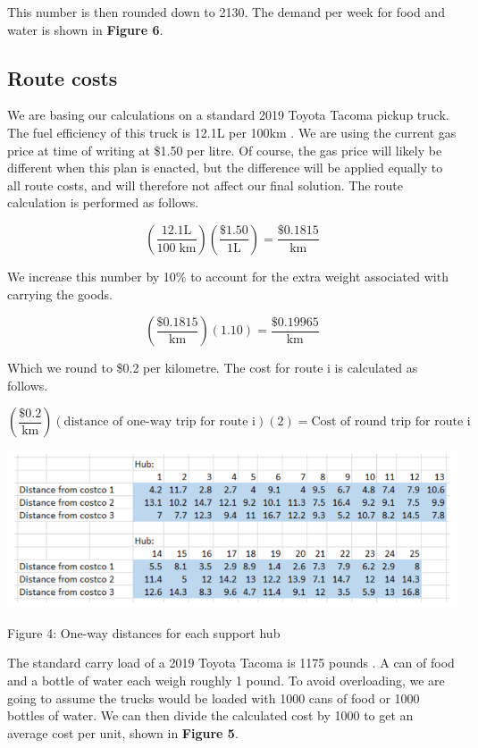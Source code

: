 \documentclass{article}
\begin{document}
This number is then rounded down to 2130. The demand per week for food and water is shown in \textbf{Figure 6}.

\subsection{Route costs}

We are basing our calculations on a standard 2019 Toyota Tacoma pickup truck. The fuel efficiency of this truck is 12.1L per 100km \cite{fuelconsumptionguide}. We are using the current gas price at time of writing at \$1.50 per litre. Of course, the gas price will likely be different when this plan is enacted, but the difference will be applied equally to all route costs, and will therefore not affect our final solution. The route calculation is performed as follows.

\[(\frac{12.1\text{L}}{100\;\text{km}})(\frac{\$1.50}{1\text{L}}) = \frac{\$0.1815}{\text{km}}\]

We increase this number by 10\% to account for the extra weight associated with carrying the goods.

\[(\frac{\$0.1815}{\text{km}})(1.10) = \frac{\$0.19965}{\text{km}}\]

Which we round to \$0.2 per kilometre. The cost for route i is calculated as follows.

\[(\frac{\$0.2}{\text{km}})(\text{distance of one-way trip for route i})(2) = \text{Cost of round trip for route i}\]

\begin{center}
 \includegraphics[scale=0.5]{distances.png}
 
 \caption{Figure 4: One-way distances for each support hub}
\end{center}

The standard carry load of a 2019 Toyota Tacoma is 1175 pounds \cite{toyotatacoma}. A can of food and a bottle of water each weigh roughly 1 pound. To avoid overloading, we are going to assume the trucks would be loaded with 1000 cans of food or 1000 bottles of water. We can then divide the calculated cost by 1000 to get an average cost per unit, shown in \textbf{Figure 5}. 
\end{document}
